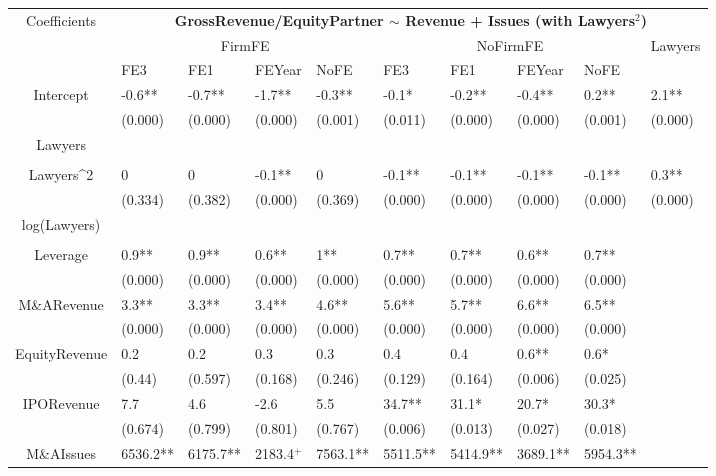 \documentclass{article}
\begin{document}
\begin{table}[H]
\centering
\begin{tabular}{|clllllllll|}
\hline
\multirow{3}{*}{Coefficients} & \multicolumn{9}{c|}{\textbf{GrossRevenue/EquityPartner $\sim$ Revenue + Issues (with Lawyers$^2$)}} \\
\cline{2-10}
& \multicolumn{4}{c}{FirmFE} & \multicolumn{4}{c}{NoFirmFE} & \multirow{2}{*}{Lawyers} \\
\cline{2-9}
& FE3 & FE1 & FEYear & NoFE & FE3 & FE1 & FEYear & NoFE &  \\
\hline
 
Intercept & -0.6** & -0.7** & -1.7** & -0.3** & -0.1* & -0.2** & -0.4** & 0.2** & 2.1** \\ 
   & (0.000) & (0.000) & (0.000) & (0.001) & (0.011) & (0.000) & (0.000) & (0.001) & (0.000) \\ 
  Lawyers &  &  &  &  &  &  &  &  &  \\ 
   &  &  &  &  &  &  &  &  &  \\ 
  Lawyers^2 & 0 & 0 & -0.1** & 0 & -0.1** & -0.1** & -0.1** & -0.1** & 0.3** \\ 
   & (0.334) & (0.382) & (0.000) & (0.369) & (0.000) & (0.000) & (0.000) & (0.000) & (0.000) \\ 
  log(Lawyers) &  &  &  &  &  &  &  &  &  \\ 
   &  &  &  &  &  &  &  &  &  \\ 
  Leverage & 0.9** & 0.9** & 0.6** & 1** & 0.7** & 0.7** & 0.6** & 0.7** &  \\ 
   & (0.000) & (0.000) & (0.000) & (0.000) & (0.000) & (0.000) & (0.000) & (0.000) &  \\ 
  M\&ARevenue & 3.3** & 3.3** & 3.4** & 4.6** & 5.6** & 5.7** & 6.6** & 6.5** &  \\ 
   & (0.000) & (0.000) & (0.000) & (0.000) & (0.000) & (0.000) & (0.000) & (0.000) &  \\ 
  EquityRevenue & 0.2 & 0.2 & 0.3 & 0.3 & 0.4 & 0.4 & 0.6** & 0.6* &  \\ 
   & (0.44) & (0.597) & (0.168) & (0.246) & (0.129) & (0.164) & (0.006) & (0.025) &  \\ 
  IPORevenue & 7.7 & 4.6 & -2.6 & 5.5 & 34.7** & 31.1* & 20.7* & 30.3* &  \\ 
   & (0.674) & (0.799) & (0.801) & (0.767) & (0.006) & (0.013) & (0.027) & (0.018) &  \\ 
  M\&AIssues & 6536.2** & 6175.7** & 2183.4$^{+}$ & 7563.1** & 5511.5** & 5414.9** & 3689.1** & 5954.3** &  \\ 

\end{tabular}
\end{table}
\end{document}
